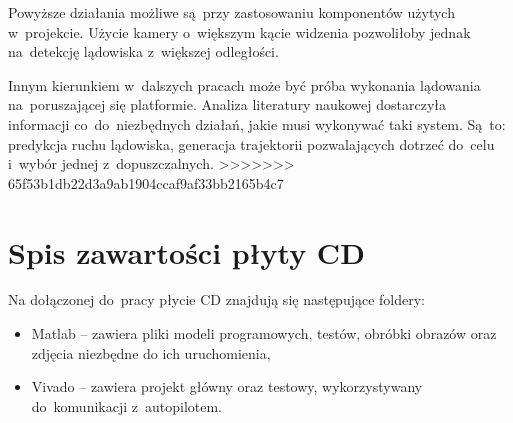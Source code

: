 Powyższe działania możliwe są~przy zastosowaniu komponentów użytych w~projekcie. Użycie kamery o~większym kącie widzenia pozwoliłoby jednak na~detekcję lądowiska z~większej odległości.\par
Innym kierunkiem w~dalszych pracach może być próba wykonania lądowania na~poruszającej się platformie. Analiza literatury naukowej dostarczyła informacji co~do~niezbędnych działań, jakie musi wykonywać taki system. Są~to: predykcja ruchu lądowiska, generacja trajektorii pozwalających dotrzeć do~celu i~wybór jednej z~dopuszczalnych.
>>>>>>> 65f53b1db22d3a9ab1904ccaf9af33bb2165b4c7

\appendix
\chapter{Spis zawartości płyty CD}
Na dołączonej do~pracy płycie CD znajdują się następujące foldery:
\begin{itemize}
	\item Matlab -- zawiera pliki modeli programowych, testów, obróbki obrazów oraz zdjęcia niezbędne do ich uruchomienia,
	\item Vivado -- zawiera projekt główny oraz testowy, wykorzystywany do~komunikacji z~autopilotem.
\end{itemize}
